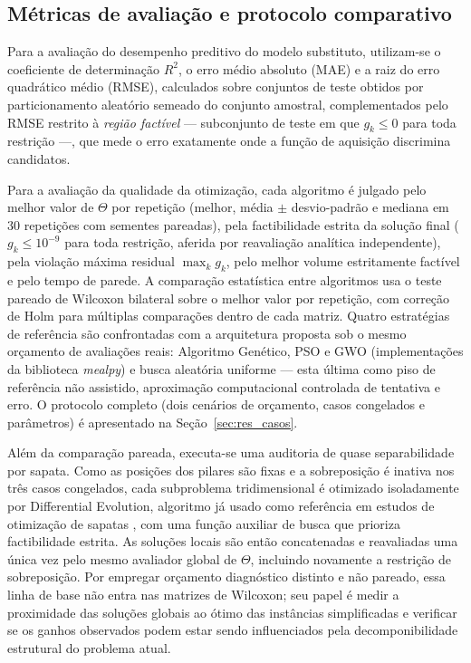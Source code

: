 \subsection{Métricas de avaliação e protocolo comparativo}
\label{sec:met_metricas}

Para a avaliação do desempenho preditivo do modelo substituto, utilizam-se o coeficiente de determinação $R^2$, o erro médio absoluto (MAE) e a raiz do erro quadrático médio (RMSE), calculados sobre conjuntos de teste obtidos por particionamento aleatório semeado do conjunto amostral, complementados pelo RMSE restrito à \textit{região factível} — subconjunto de teste em que $g_k \le 0$ para toda restrição —, que mede o erro exatamente onde a função de aquisição discrimina candidatos.

Para a avaliação da qualidade da otimização, cada algoritmo é julgado pelo melhor valor de $\Theta$ por repetição (melhor, média $\pm$ desvio-padrão e mediana em 30 repetições com sementes pareadas), pela factibilidade estrita da solução final ($g_k \le 10^{-9}$ para toda restrição, aferida por reavaliação analítica independente), pela violação máxima residual $\max_k g_k$, pelo melhor volume estritamente factível e pelo tempo de parede. A comparação estatística entre algoritmos usa o teste pareado de Wilcoxon bilateral sobre o melhor valor por repetição, com correção de Holm para múltiplas comparações dentro de cada matriz. Quatro estratégias de referência são confrontadas com a arquitetura proposta sob o mesmo orçamento de avaliações reais: Algoritmo Genético, PSO e GWO (implementações da biblioteca \textit{mealpy}) e busca aleatória uniforme — esta última como piso de referência não assistido, aproximação computacional controlada de tentativa e erro. O protocolo completo (dois cenários de orçamento, casos congelados e parâmetros) é apresentado na Seção~\ref{sec:res_casos}.

Além da comparação pareada, executa-se uma auditoria de quase separabilidade por sapata. Como as posições dos pilares são fixas e a sobreposição é inativa nos três casos congelados, cada subproblema tridimensional é otimizado isoladamente por Differential Evolution, algoritmo já usado como referência em estudos de otimização de sapatas , com uma função auxiliar de busca que prioriza factibilidade estrita. As soluções locais são então concatenadas e reavaliadas uma única vez pelo mesmo avaliador global de $\Theta$, incluindo novamente a restrição de sobreposição. Por empregar orçamento diagnóstico distinto e não pareado, essa linha de base não entra nas matrizes de Wilcoxon; seu papel é medir a proximidade das soluções globais ao ótimo das instâncias simplificadas e verificar se os ganhos observados podem estar sendo influenciados pela decomponibilidade estrutural do problema atual.
